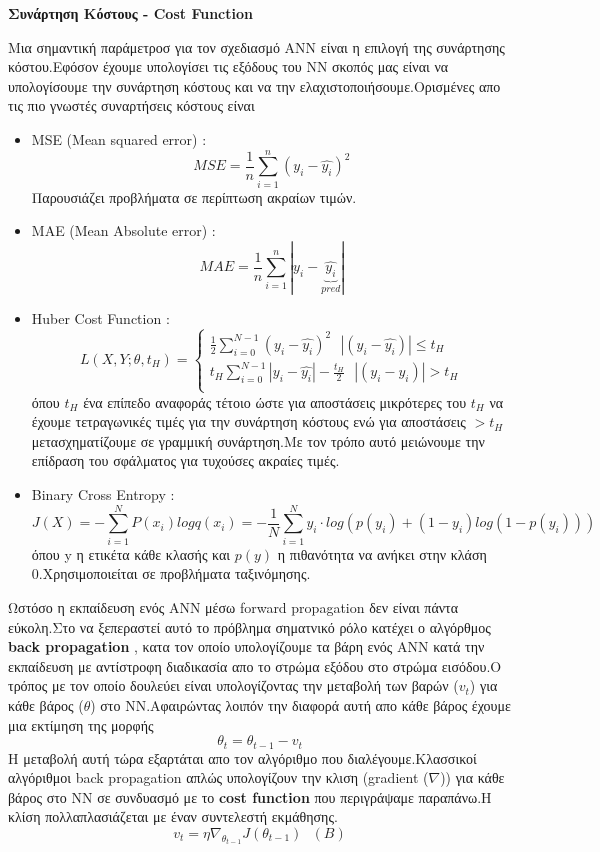 \documentclass[12pt,a4paper]{article}
\begin{document}
\textbf{Συνάρτηση Κόστους - Cost Function}


\par Μια σημαντική παράμετροσ για τον σχεδιασμό ANN είναι η επιλογή της συνάρτησης κόστου.Εφόσον έχουμε υπολογίσει τις εξόδους του NN σκοπός μας είναι να υπολογίσουμε την συνάρτηση κόστους και να την ελαχιστοποιήσουμε.Ορισμένες απο τις πιο γνωστές συναρτήσεις κόστους είναι
\begin{itemize}
  \item MSE (Mean squared error)  :
  $$MSE = \frac{1}{n} \sum_{i=1}^n (y_i-\hat{y_i})^2$$
 Παρουσιάζει προβλήματα σε περίπτωση ακραίων τιμών.
\item MAE (Mean Absolute error) :
$$MAE = \frac{1}{n}\sum_{i=1}^n |y_i - \underbrace{\hat{y_i}}_{pred}| $$

\item Huber Cost Function :
$$L(X,Y;\theta ,t_H) =
\begin{cases}
\frac{1}{2} \sum_{i=0}^{N-1}(y_i-\hat{y_i})^2 \ \ \ |(y_i-\hat{y_i})| \leq t_H\\
t_H \sum_{i=0}^{N-1}|y_i-\hat{y_i}| - \frac{t_H}{2} \ \ \ |(y_i-\hat{y_i})| > t_H\\
  \end{cases}$$
όπου $t_H$ ένα επίπεδο αναφοράς τέτοιο ώστε για αποστάσεις μικρότερες του $t_H$ να έχουμε τετραγωνικές τιμές για την συνάρτηση κόστους ενώ για αποστάσεις $> t_H$ μετασχηματίζουμε σε γραμμική συνάρτηση.Με τον τρόπο αυτό μειώνουμε την επίδραση του σφάλματος για τυχούσες ακραίες τιμές.


 \item Binary Cross Entropy :
 $$J(X) =-\sum_{i=1}^N P(x_i) log q(x_i) = -\frac{1}{N} \sum_{i=1}^N y_i \cdot log(p(y_i)+(1-y_i)log(1-p(y_i)))$$
 όπου y η ετικέτα κάθε κλασής και $p(y)$ η πιθανότητα να ανήκει στην κλάση 0.Χρησιμοποιείται σε προβλήματα ταξινόμησης.
\end{itemize}

Ωστόσο η εκπαίδευση ενός ANN μέσω forward propagation δεν είναι πάντα εύκολη.Στο να ξεπεραστεί αυτό το πρόβλημα σηματνικό ρόλο κατέχει ο αλγόρθμος \textbf{back propagation} , κατα τον οποίο υπολογίζουμε τα βάρη ενός ANN κατά την εκπαίδευση με αντίστροφη διαδικασία απο το στρώμα εξόδου στο στρώμα εισόδου.O τρόπος με τον οποίο δουλεύει είναι υπολογίζοντας την μεταβολή των βαρών ($ v_t$) για κάθε βάρος ($\theta$) στο NN.Αφαιρώντας λοιπόν την διαφορά αυτή απο κάθε βάρος έχουμε μια εκτίμηση της μορφής
$$\theta_t =\theta_{t-1} -v_t$$
Η μεταβολή αυτή τώρα εξαρτάται απο τον αλγόριθμο που διαλέγουμε.Κλασσικοί αλγόριθμοι back propagation απλώς υπολογίζουν την κλιση (gradient ($\nabla$)) για κάθε βάρος στο NN σε συνδυασμό με το \textbf{cost function} που περιγράψαμε παραπάνω.Η κλίση πολλαπλασιάζεται με έναν συντελεστή εκμάθησης.
$$v_t = \eta \nabla_{\theta_{t-1}}J(\theta_{t-1})\ \ \ (B)$$
\end{document}
